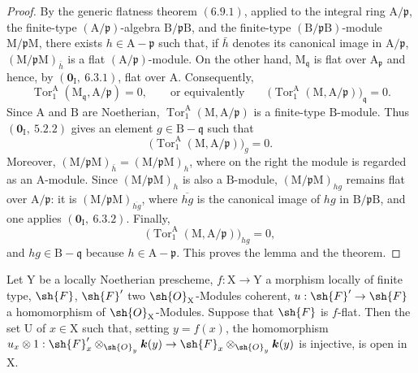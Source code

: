 \begin{proof}

By the generic flatness theorem $(6.9.1)$, applied to the integral ring
$\mathrm{A}/\mathfrak{p}$, the finite-type
$(\mathrm{A}/\mathfrak{p})$-algebra
$\mathrm{B}/\mathfrak{p}\mathrm{B}$, and the finite-type
$(\mathrm{B}/\mathfrak{p}\mathrm{B})$-module
$\mathrm{M}/\mathfrak{p}\mathrm{M}$, there exists
$h\in\mathrm{A}-\mathfrak{p}$ such that, if $\bar h$ denotes its canonical
image in $\mathrm{A}/\mathfrak{p}$,
$(\mathrm{M}/\mathfrak{p}\mathrm{M})_{\bar h}$ is a flat
$(\mathrm{A}/\mathfrak{p})$-module. On the other hand,
$\mathrm{M}_{\mathfrak q}$ is flat over $\mathrm{A}_{\mathfrak p}$ and
hence, by $(\mathbf{0}_\mathrm{I},~6.3.1)$, flat over $\mathrm{A}$.
Consequently,
\[
  \operatorname{Tor}_1^\mathrm{A}
  (\mathrm{M}_{\mathfrak q},\mathrm{A}/\mathfrak p)=0,
  \qquad\text{or equivalently}\qquad
  \bigl(\operatorname{Tor}_1^\mathrm{A}
  (\mathrm{M},\mathrm{A}/\mathfrak p)\bigr)_{\mathfrak q}=0.
\]
Since $\mathrm{A}$ and $\mathrm{B}$ are Noetherian,
$\operatorname{Tor}_1^\mathrm{A}
(\mathrm{M},\mathrm{A}/\mathfrak p)$ is a finite-type
$\mathrm{B}$-module. Thus $(\mathbf{0}_\mathrm{I},~5.2.2)$ gives an element
$g\in\mathrm{B}-\mathfrak q$ such that
\[
  \bigl(\operatorname{Tor}_1^\mathrm{A}
  (\mathrm{M},\mathrm{A}/\mathfrak p)\bigr)_g=0.
\]
Moreover,
$(\mathrm{M}/\mathfrak p\mathrm{M})_{\bar h}
=(\mathrm{M}/\mathfrak p\mathrm{M})_h$, where on the right the module is
regarded as an $\mathrm{A}$-module. Since
$(\mathrm{M}/\mathfrak p\mathrm{M})_h$ is also a $\mathrm{B}$-module,
$(\mathrm{M}/\mathfrak p\mathrm{M})_{hg}$ remains flat over
$\mathrm{A}/\mathfrak p$: it is
$(\mathrm{M}/\mathfrak p\mathrm{M})_{\overline{hg}}$, where
$\overline{hg}$ is the canonical image of $hg$ in
$\mathrm{B}/\mathfrak p\mathrm{B}$, and one applies
$(\mathbf{0}_\mathrm{I},~6.3.2)$. Finally,
\[
  \bigl(\operatorname{Tor}_1^\mathrm{A}
  (\mathrm{M},\mathrm{A}/\mathfrak p)\bigr)_{hg}=0,
\]
and $hg\in\mathrm{B}-\mathfrak q$ because
$h\in\mathrm{A}-\mathfrak p$. This proves the lemma and the theorem.
\end{proof}

\begin{corollary}[11.1.2]
\label{IV.11.1.2}
Let $\mathrm{Y}$ be a locally Noetherian prescheme, $f:\mathrm{X}\to\mathrm{Y}$ a morphism locally of finite type, $\sh{F}$, $\sh{F}'$ two $\sh{O}_\mathrm{X}$-Modules coherent, $u:\sh{F}'\to\sh{F}$ a homomorphism of $\sh{O}_\mathrm{X}$-Modules. Suppose that $\sh{F}$ is $f$-flat. Then the set $\mathrm{U}$ of $x\in\mathrm{X}$ such that, setting $y=f(x)$, the homomorphism $u_x\otimes 1:\sh{F}'_x\otimes_{\sh{O}_y}\boldsymbol{k}(y)\to\sh{F}_x\otimes_{\sh{O}_y}\boldsymbol{k}(y)$ is injective, is open in $\mathrm{X}$.
\end{corollary}

